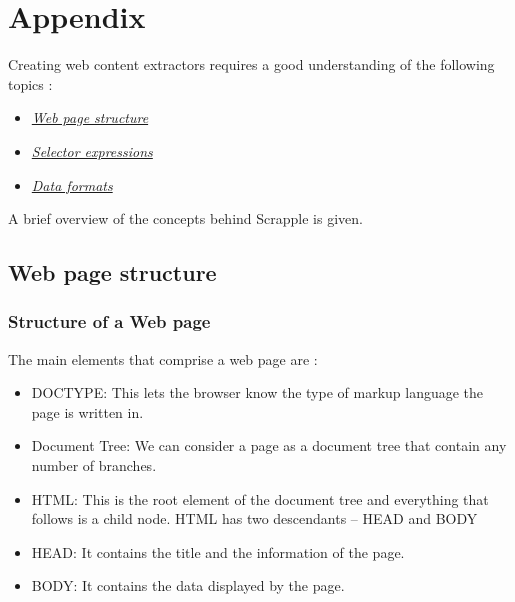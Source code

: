 \documentclass[letterpaper,12pt,english]{sphinxmanual}
\begin{document}
\chapter{Appendix}
\label{index:appendix}
Creating web content extractors requires a good understanding of the following topics :
\begin{itemize}
\item {} 
{\hyperref[concepts/structure::doc]{\emph{Web page structure}}}

\item {} 
{\hyperref[concepts/selectors::doc]{\emph{Selector expressions}}}

\item {} 
{\hyperref[concepts/formats::doc]{\emph{Data formats}}}

\end{itemize}

A brief overview of the concepts behind Scrapple is given.


\section{Web page structure}
\label{concepts/structure:web-page-structure}\label{concepts/structure::doc}\label{concepts/structure:concepts-structure}

\subsection{Structure of a Web page}
\label{concepts/structure:structure-of-a-web-page}
The main elements that comprise a web page are :
\begin{itemize}
\item {} 
DOCTYPE: This lets the browser know the type of markup language the page is written in.

\item {} 
Document Tree: We can consider a page as a document tree that contain any number of branches.

\item {} 
HTML: This is the root element of the document tree and everything that follows is a child node. HTML has two descendants – HEAD and BODY

\item {} 
HEAD: It contains the title and the information of the page.

\item {} 
BODY: It contains the data displayed by the page.

\end{itemize}
\end{document}
